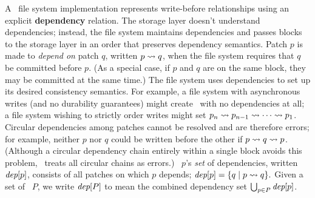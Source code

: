 A \Featherstitch\ file system implementation represents write-before
 relationships using an explicit \textbf{dependency} relation.
%
The storage layer doesn't understand dependencies; instead, the file system
 maintains dependencies and passes blocks to the storage layer in an
 order that preserves dependency semantics.
%
Patch $p$ is made to \emph{depend on} patch $q$, written $p \leadsto q$,
 when the file system requires that $q$ be committed before $p$.
%
(As a special case, if $p$ and $q$ are on the same block, they may be
 committed at the same time.)
%
The file system uses dependencies to set up its desired consistency
 semantics.
%
For example, a file system with asynchronous writes (and no durability
 guarantees) might create \patches\ with no dependencies at all;
%
a file system wishing to strictly order writes might set
 $p_n \leadsto p_{n-1} \leadsto \cdots \leadsto p_1$.
%
%
%
Circular dependencies among patches cannot be resolved and are therefore
 errors;  for example, neither $p$ nor $q$ could be written before the
 other if $p \leadsto q \leadsto p$.
%
(Although a circular dependency chain entirely within a single block avoids
 this problem, \Kudos\ treats all circular chains as errors.)
%
\Patch\ $p$'s \emph{set} of dependencies, written $\textit{dep}[p]$, consists
 of all patches on which $p$ depends;
%
\( \textit{dep}[p] = \{ q \mid p \leadsto q \}. \)
%
Given a set of \patches\ $P$, we write $\textit{dep}[P]$ to mean the
 combined dependency set $\bigcup_{p\in P} \textit{dep}[p]$. 


